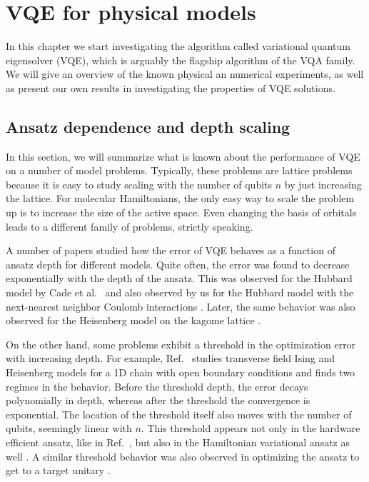 \chapter{VQE for physical models}
\label{chap:vqe_numerics}

In this chapter we start investigating the algorithm called variational quantum eigensolver (VQE), which is arguably the flagship algorithm of the VQA family. We will give an overview of the known physical an numerical experiments, as well as present our own results in investigating the properties of VQE solutions.



\section{Ansatz dependence and depth scaling}

In this section, we will summarize what is known about the performance of VQE on a number of model problems. Typically, these problems are lattice problems because it is easy to study scaling with the number of qubits $n$ by just increasing the lattice. For molecular Hamiltonians, the only easy way to scale the problem up is to increase the size of the active space. Even changing the basis of orbitals leads to a different family of problems, strictly speaking.

A number of papers studied how the error of VQE behaves as a function of ansatz depth for different models. Quite often, the error was found to decrease exponentially with the depth of the ansatz. This was observed for the Hubbard model by Cade et al.~\cite{cade_strategies_2019} and also observed by us for the Hubbard model with the next-nearest neighbor Coulomb interactions \cite{uvarov_variational_2020}. Later, the same behavior was also observed for the Heisenberg model on the kagome lattice \cite{kattemolle_variational_2021,bosse_probing_2021}. 

On the other hand, some problems exhibit a threshold in the optimization error with increasing depth. For example, Ref.~\cite{bravo-prieto_scaling_2020} studies transverse field Ising and Heisenberg models for a 1D chain with open boundary conditions and finds two regimes in the behavior. Before the threshold depth, the error decays polynomially in depth, whereas after the threshold the convergence is exponential. The location of the threshold itself also moves with the number of qubits, seemingly linear with $n$. This threshold appears not only in the hardware efficient ansatz, like in Ref.~\cite{bravo-prieto_scaling_2020}, but also in the Hamiltonian variational ansatz as well \cite{wiersema_exploring_2020}. A similar threshold behavior was also observed in optimizing the ansatz to get to a target unitary \cite{kiani_learning_2020,campos_abrupt_2020}.

